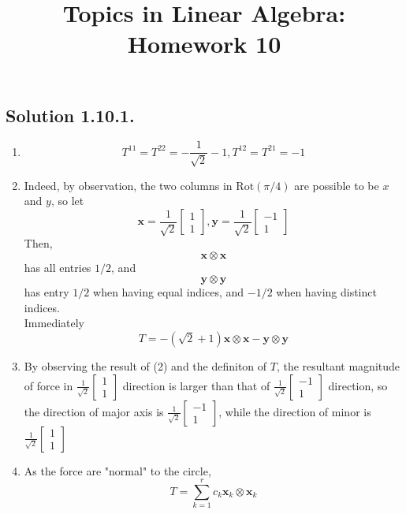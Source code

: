 \documentclass{article}
\title{Topics in Linear Algebra: Homework 10}
\begin{document}
\maketitle
\subsection*{Solution 1.10.1.}
\begin{enumerate}
\item 
\[T^{11} = T^{22} =  -\frac{1}{\sqrt{2}} -1, T^{12} = T^{21} = -1\]
\item

Indeed, by observation, the two columns in $\mathrm{Rot}(\pi/4)$ are possible to be $x$ and $y$, so let 
\[\mathbf{x} = \frac{1}{\sqrt{2}}\left[\begin{array}{c} 1 \\ 1 \end{array}\right],\mathbf{y} = \frac{1}{\sqrt{2}}\left[\begin{array}{c} -1 \\ 1 \end{array}\right] \]
Then, 
\[\mathbf{x} \otimes \mathbf{x}\]
has all entries $1/2$, and 
\[\mathbf{y} \otimes \mathbf{y}\]
has entry $1/2$ when having equal indices, and  $-1/2$ when having distinct indices. \\
Immediately
\[T = -(\sqrt{2}+1)\mathbf{x} \otimes \mathbf{x} - \mathbf{y} \otimes \mathbf{y}\]
\item
By observing the result of (2) and the definiton of $T$, the resultant magnitude of force in $\frac{1}{\sqrt{2}}\left[\begin{array}{c} 1 \\ 1\end{array}\right]$ direction is larger than that of $\frac{1}{\sqrt{2}}\left[\begin{array}{c} -1 \\ 1\end{array}\right]$ direction, so the direction of major axis is
$\frac{1}{\sqrt{2}}\left[\begin{array}{c} -1 \\ 1\end{array}\right]$, while the direction of minor is $\frac{1}{\sqrt{2}}\left[\begin{array}{c} 1 \\ 1\end{array}\right]$
\item
As the force are "normal" to the circle, 
\[T = \sum_{k=1} ^ r c_k \mathbf{x}_k \otimes \mathbf{x}_k\]

\end{enumerate}
\end{document}
